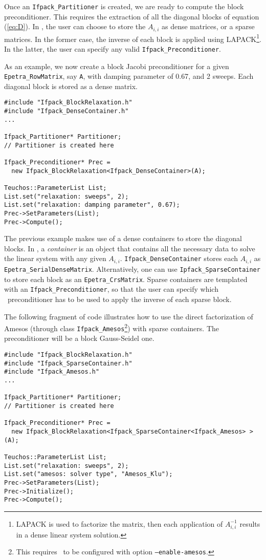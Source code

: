 Once an \verb!Ifpack_Partitioner! is created, we are ready to
compute the block preconditioner. This requires the extraction of
all the diagonal blocks of equation (\ref{eq:D}). In \ifpack, the
user can choose to store the $A_{i,i}$ as dense matrices, or a sparse
matrices. In the former case, the inverse of each block is applied using
LAPACK\footnote{LAPACK is used to factorize the matrix, then each application
  of $A_{i,i}^{-1}$ results in a dense linear system solution.}. In the
  latter, the user can specify any valid \verb!Ifpack_Preconditioner!.

As an example, we now create a block Jacobi preconditioner for 
a given \verb!Epetra_RowMatrix!, say \verb!A!,
with damping parameter of 0.67, and 2 sweeps. Each diagonal block is stored as a dense
matrix.

\begin{verbatim}
#include "Ifpack_BlockRelaxation.h"
#include "Ifpack_DenseContainer.h"
...

Ifpack_Partitioner* Partitioner;
// Partitioner is created here

Ifpack_Preconditioner* Prec =
  new Ifpack_BlockRelaxation<Ifpack_DenseContainer>(A);

Teuchos::ParameterList List;
List.set("relaxation: sweeps", 2);
List.set("relaxation: damping parameter", 0.67);
Prec->SetParameters(List);
Prec->Compute();
\end{verbatim}
The previous example makes use of a dense containers to store
the diagonal blocks.
In \ifpack, a {\sl container} is an object that contains all the necessary
data to solve the linear system with any given $A_{i,i}$. 
\verb!Ifpack_DenseContainer! stores each $A_{i,i}$ as
\verb!Epetra_SerialDenseMatrix!. Alternatively, one can use 
\verb!Ipfack_SparseContainer! to store each block as an
\verb!Epetra_CrsMatrix!. Sparse containers are templated with an
\verb!Ifpack_Preconditioner!, so that the user can specify which \ifpack\
  preconditioner has to be used to apply the inverse of each sparse block.

The following fragment of code illustrates how to use the direct factorization
of Amesos (through class \verb!Ifpack_Amesos!\footnote{This requires \ifpack\
	   to be configured with option {\tt --enable-amesos}.}) with sparse containers. The preconditioner will be a block Gauss-Seidel one.

\begin{verbatim}
#include "Ifpack_BlockRelaxation.h"
#include "Ifpack_SparseContainer.h"
#include "Ifpack_Amesos.h"
...

Ifpack_Partitioner* Partitioner;
// Partitioner is created here

Ifpack_Preconditioner* Prec =
  new Ifpack_BlockRelaxation<Ifpack_SparseContainer<Ifpack_Amesos> >(A);

Teuchos::ParameterList List;
List.set("relaxation: sweeps", 2);
List.set("amesos: solver type", "Amesos_Klu");
Prec->SetParameters(List);
Prec->Initialize();
Prec->Compute();
\end{verbatim}

